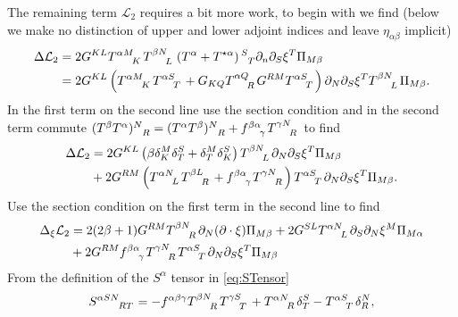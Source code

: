 The remaining term $\mathcal{L}_2$ requires a bit more work, to begin with we find (below we make no distinction of upper and lower adjoint indices and leave $\eta_{\alpha\beta}$ implicit)
\begin{equation}
    \begin{aligned}
    \Delta \mathcal{L}_2 &= 2G^{KL}\tensor{T}{^{\alpha M}_K}\tensor{T}{^{\beta N}_L}\left(T^\alpha+T^{\star\alpha}\right)\tensor{}{^S_T}\pd_n\pd_S\xi^T\Pi_{M\beta}\\
    &= 2G^{KL}\left(\tensor{T}{^{\alpha M}_K}\tensor{T}{^{\alpha S}_T}+G_{KQ}\tensor{T}{^{\alpha Q}_R}G^{RM}\tensor{T}{^{\alpha S}_T}\right)\pd_N\pd_S\xi^T\tensor{T}{^{\beta N}_L}\Pi_{M\beta}.
    \end{aligned}
\end{equation}
In the first term on the second line use the section condition and in the second term commute $(T^\beta T^\alpha)\tensor{}{^N_R} = (T^{\alpha}T^\beta)\tensor{}{^N_R}+\tensor{f}{^{\beta\alpha}_\gamma}\tensor{T}{^{\gamma N}_R}$ to find 
\begin{equation}
    \begin{aligned}
        \Delta \mathcal{L}_2 &= 2G^{KL}\left(\beta\delta^M_K\delta^S_T+\delta^M_T\delta^S_K\right)\tensor{T}{^{\beta N}_L}\pd_N\pd_S\xi^T\Pi_{M\beta}\\
        &+ 2G^{RM}\left(\tensor{T}{^{\alpha N}_L}\tensor{T}{^{\beta L}_R}+\tensor{f}{^{\beta\alpha}_\gamma}\tensor{T}{^{\gamma N}_R}\right)\tensor{T}{^{\alpha S}_T}\pd_N\pd_S\xi^T\Pi_{M\beta}.
    \end{aligned}
\end{equation}
Use the section condition on the first term in the second line to find 
\begin{equation}\label{eq:Peter}
    \begin{aligned}
        \Delta_\xi \mathcal{L}_2 &= 2(2\beta+1)G^{RM}\tensor{T}{^{\beta N}_R}\pd_N(\pd\cdot\xi)\Pi_{M\beta}+2G^{SL}\tensor{T}{^{\alpha N}_L}\pd_S\pd_N\xi^M\Pi_{M\alpha}\\
        &+2G^{RM}\tensor{f}{^{\beta\alpha}_\gamma}\tensor{T}{^{\gamma N}_R}\tensor{T}{^{\alpha S}_T}\pd_N\pd_S\xi^T\Pi_{M\beta}
    \end{aligned}
\end{equation}
From the definition of the $S^\alpha$ tensor in \eqref{eq:STensor}
\begin{equation}
    \tensor{S}{^{\alpha SN}_{RT}} = -\tensor{f}{^{\alpha\beta\gamma}}\tensor{T}{^{\beta N}_R}\tensor{T}{^{\gamma S}_T}+\tensor{T}{^{\alpha N}_R}\delta^S_T-\tensor{T}{^{\alpha S}_T}\delta^N_R,
\end{equation}
